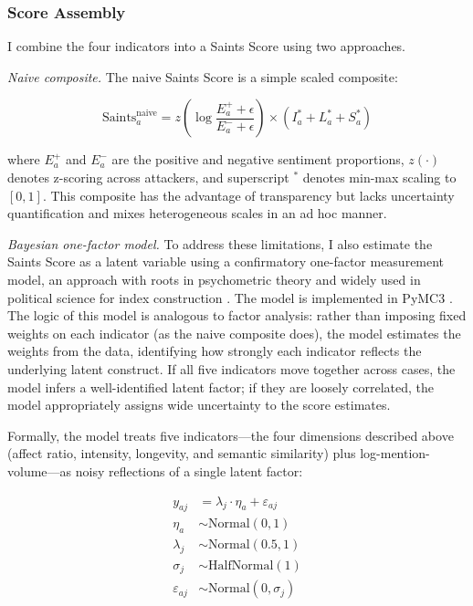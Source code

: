 \documentclass[12pt]{article}
\begin{document}
\subsubsection{Score Assembly}

I combine the four indicators into a Saints Score using two approaches.

\textit{Naive composite.} The naive Saints Score is a simple scaled composite:

\begin{equation}
\text{Saints}_a^{\text{naive}} = z\!\left(\log \frac{E_a^{+} + \epsilon}{E_a^{-} + \epsilon}\right) \times \left(I_a^{*} + L_a^{*} + S_a^{*}\right)
\end{equation}

\noindent where $E_a^{+}$ and $E_a^{-}$ are the positive and negative sentiment proportions, $z(\cdot)$ denotes z-scoring across attackers, and superscript $^{*}$ denotes min-max scaling to $[0, 1]$. This composite has the advantage of transparency but lacks uncertainty quantification and mixes heterogeneous scales in an ad hoc manner.

\textit{Bayesian one-factor model.} To address these limitations, I also estimate the Saints Score as a latent variable using a confirmatory one-factor measurement model, an approach with roots in psychometric theory and widely used in political science for index construction \parencite{treier2008democracy, jackman2009bayesian}. The model is implemented in PyMC3 \parencite{salvatier2016pymc3}. The logic of this model is analogous to factor analysis: rather than imposing fixed weights on each indicator (as the naive composite does), the model estimates the weights from the data, identifying how strongly each indicator reflects the underlying latent construct. If all five indicators move together across cases, the model infers a well-identified latent factor; if they are loosely correlated, the model appropriately assigns wide uncertainty to the score estimates.

Formally, the model treats five indicators---the four dimensions described above (affect ratio, intensity, longevity, and semantic similarity) plus log-mention-volume---as noisy reflections of a single latent factor:

\begin{align}
y_{aj} &= \lambda_j \cdot \eta_a + \varepsilon_{aj} \\
\eta_a &\sim \text{Normal}(0, 1) \\
\lambda_j &\sim \text{Normal}(0.5, 1) \\
\sigma_j &\sim \text{HalfNormal}(1) \\
\varepsilon_{aj} &\sim \text{Normal}(0, \sigma_j)
\end{align}
\end{document}
